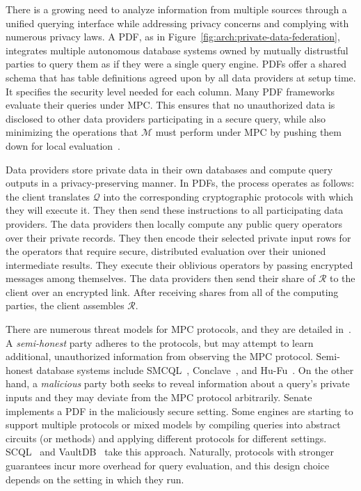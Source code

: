 \documentclass[11pt]{article}
\newcommand{\shortsection}[1]{\vspace{0.2em}\noindent {\bf #1.}}
\newcommand{\mechanism}{$\mathcal{M}$\xspace}
\newcommand{\answer}{$\mathcal{R}$\xspace}
\newcommand{\query}{$\mathcal{Q}$\xspace}
\begin{document}
\shortsection{Private Data Federations} There is a growing need to analyze information from multiple sources through a unified querying interface while addressing privacy concerns and complying with numerous privacy laws. A PDF, as  in Figure~\ref{fig:arch:private-data-federation}, integrates multiple autonomous database systems owned by mutually distrustful parties to query them as if they were a single query engine.  PDFs offer a shared schema that has table definitions agreed upon by all data providers at setup time.  It specifies the security level needed for each column.  Many PDF frameworks evaluate their queries under MPC.    This ensures that no unauthorized data is disclosed to other data providers participating in a secure query, while also minimizing the operations that \mechanism must perform under MPC by pushing them down for local evaluation~\cite{bater2017smcql, volgushev2019conclave, liagouris2023secrecy}.  


Data providers store private data in their own databases and compute query outputs in a privacy-preserving manner.  In PDFs, the process operates as follows: the client translates \query into the corresponding cryptographic protocols with which they will execute it.  They then send these instructions to all participating data providers.  The data providers then locally compute any public query operators  over their private records.  They then encode their selected private input rows for the operators that require secure, distributed evaluation over their unioned intermediate results.  They execute their oblivious operators by passing encrypted messages among themselves.  The data providers then send their share of \answer to the client over an encrypted link.  After receiving shares from all of the computing parties, the client assembles \answer. 

There are numerous threat models for MPC protocols, and they are detailed in~\cite{lindell2021mpc}.    A {\em semi-honest} party adheres to the protocols, but may attempt to learn additional, unauthorized information from observing the MPC protocol.  Semi-honest database systems include SMCQL~\cite{bater2017smcql}, Conclave~\cite{volgushev2019conclave}, and Hu-Fu~\cite{tong2022hu}. On the other hand, a {\em malicious} party both seeks to reveal information about a query's private inputs and they may deviate from the MPC protocol arbitrarily.  Senate~\cite{poddar2021senate} implements a PDF in the maliciously secure setting.  Some engines are starting to support multiple protocols or mixed models by compiling queries into abstract circuits (or methods) and applying different protocols for different settings.  SCQL~\cite{ant2024scql} and VaultDB~\cite{rogers2022vaultdb, vaultdb} take this approach.  Naturally, protocols with stronger guarantees incur more overhead for query evaluation, and this design choice depends on the setting in which they run.
\end{document}
